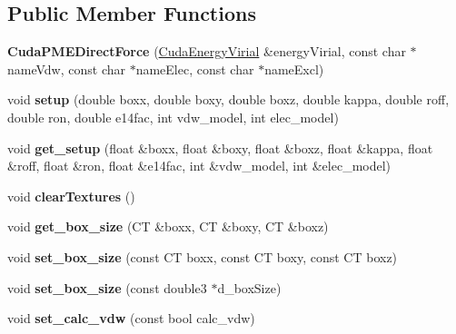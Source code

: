 \subsection*{Public Member Functions}
\begin{DoxyCompactItemize}
\item 
\hypertarget{classCudaPMEDirectForce_a37a0656f51ce5edb079ac385a44ac343}{}\label{classCudaPMEDirectForce_a37a0656f51ce5edb079ac385a44ac343} 
{\bfseries Cuda\+P\+M\+E\+Direct\+Force} (\hyperlink{classCudaEnergyVirial}{Cuda\+Energy\+Virial} \&energy\+Virial, const char $\ast$name\+Vdw, const char $\ast$name\+Elec, const char $\ast$name\+Excl)
\item 
\hypertarget{classCudaPMEDirectForce_a75b212b3a1129a30ce0dcaf9da78f82a}{}\label{classCudaPMEDirectForce_a75b212b3a1129a30ce0dcaf9da78f82a} 
void {\bfseries setup} (double boxx, double boxy, double boxz, double kappa, double roff, double ron, double e14fac, int vdw\+\_\+model, int elec\+\_\+model)
\item 
\hypertarget{classCudaPMEDirectForce_aa10b0fc2ab0e030f9bd336b4d1cb4371}{}\label{classCudaPMEDirectForce_aa10b0fc2ab0e030f9bd336b4d1cb4371} 
void {\bfseries get\+\_\+setup} (float \&boxx, float \&boxy, float \&boxz, float \&kappa, float \&roff, float \&ron, float \&e14fac, int \&vdw\+\_\+model, int \&elec\+\_\+model)
\item 
\hypertarget{classCudaPMEDirectForce_a87260fe946f2deb76f0e46e3a175f43f}{}\label{classCudaPMEDirectForce_a87260fe946f2deb76f0e46e3a175f43f} 
void {\bfseries clear\+Textures} ()
\item 
\hypertarget{classCudaPMEDirectForce_a19b17fbe88dd50ed22d4bff34599cda6}{}\label{classCudaPMEDirectForce_a19b17fbe88dd50ed22d4bff34599cda6} 
void {\bfseries get\+\_\+box\+\_\+size} (CT \&boxx, CT \&boxy, CT \&boxz)
\item 
\hypertarget{classCudaPMEDirectForce_a5f079b84323cc87d6e00744753a868a1}{}\label{classCudaPMEDirectForce_a5f079b84323cc87d6e00744753a868a1} 
void {\bfseries set\+\_\+box\+\_\+size} (const CT boxx, const CT boxy, const CT boxz)
\item 
\hypertarget{classCudaPMEDirectForce_a167ba74f2475f5e2f5737adcde0f8bc0}{}\label{classCudaPMEDirectForce_a167ba74f2475f5e2f5737adcde0f8bc0} 
void {\bfseries set\+\_\+box\+\_\+size} (const double3 $\ast$d\+\_\+box\+Size)
\item 
\hypertarget{classCudaPMEDirectForce_ae3503a8806292af61d2a43225397f811}{}\label{classCudaPMEDirectForce_ae3503a8806292af61d2a43225397f811} 
void {\bfseries set\+\_\+calc\+\_\+vdw} (const bool calc\+\_\+vdw)

\end{DoxyCompactItemize}
